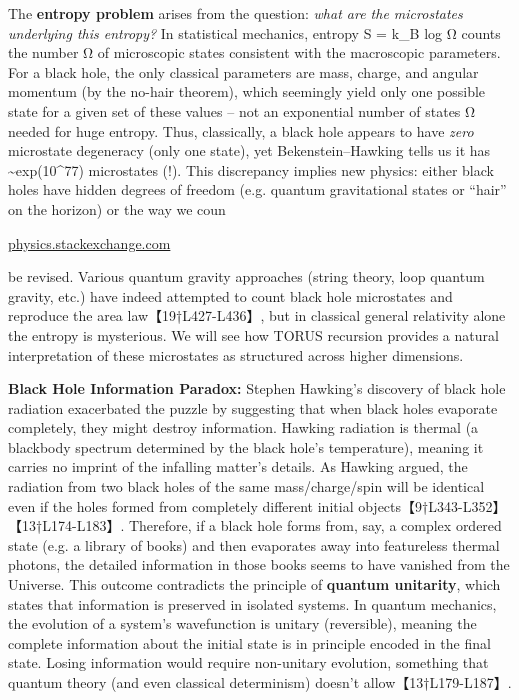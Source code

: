 \documentclass[]{article}
\begin{document}
The \textbf{entropy problem} arises from the question: \emph{what are
the microstates underlying this entropy?} In statistical mechanics,
entropy S = k\_B log Ω counts the number Ω of microscopic states
consistent with the macroscopic parameters. For a black hole, the only
classical parameters are mass, charge, and angular momentum (by the
no-hair theorem), which seemingly yield only one possible state for a
given set of these values -- not an exponential number of states Ω
needed for huge entropy. Thus, classically, a black hole appears to have
\emph{zero} microstate degeneracy (only one state), yet
Bekenstein--Hawking tells us it has \textasciitilde{}exp(10\^{}77)
microstates (!). This discrepancy implies new physics: either black
holes have hidden degrees of freedom (e.g. quantum gravitational states
or ``hair'' on the horizon) or the way we coun​

\href{https://physics.stackexchange.com/questions/3521/has-the-black-hole-information-loss-paradox-been-settled\#:~:text=1,what\%20the\%20right\%20answer\%20is}{physics.stackexchange.com}

be revised. Various quantum gravity approaches (string theory, loop
quantum gravity, etc.) have indeed attempted to count black hole
microstates and reproduce the area law【19†L427-L436】, but in classical
general relativity alone the entropy is mysterious. We will see how
TORUS recursion provides a natural interpretation of these microstates
as structured across higher dimensions.

\textbf{Black Hole Information Paradox:} Stephen Hawking's discovery of
black hole radiation exacerbated the puzzle by suggesting that when
black holes evaporate completely, they might destroy information.
Hawking radiation is thermal (a blackbody spectrum determined by the
black hole's temperature), meaning it carries no imprint of the
infalling matter's details. As Hawking argued, the radiation from two
black holes of the same mass/charge/spin will be identical even if the
holes formed from completely different initial
objects【9†L343-L352】【13†L174-L183】. Therefore, if a black hole forms
from, say, a complex ordered state (e.g. a library of books) and then
evaporates away into featureless thermal photons, the detailed
information in those books seems to have vanished from the Universe.
This outcome contradicts the principle of \textbf{quantum unitarity},
which states that information is preserved in isolated systems. In
quantum mechanics, the evolution of a system's wavefunction is unitary
(reversible), meaning the complete information about the initial state
is in principle encoded in the final state. Losing information would
require non-unitary evolution, something that quantum theory (and even
classical determinism) doesn't allow【13†L179-L187】.
\end{document}
